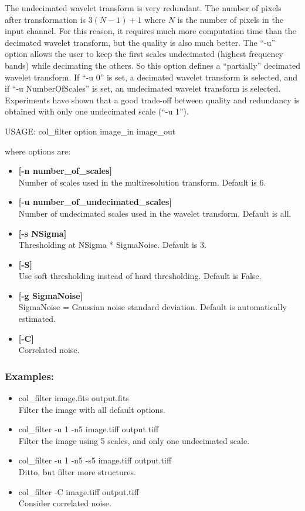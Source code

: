 The undecimated wavelet transform is very redundant. The number of pixels
after transformation is $3(N-1)+1$ where $N$ is the number of pixels in the
input channel. For this reason, it requires much more computation time
than the decimated wavelet transform, but the quality is also much better.
The ``-u'' option allows the user to keep the first scales undecimated 
(highest frequency bands) while decimating the others. So this option defines 
a ``partially'' decimated wavelet transform. If ``-u 0'' is set, a decimated
wavelet transform is selected, and if ``-u NumberOfScales'' is set, an
undecimated wavelet transform
is selected. Experiments have shown that a good trade-off between
quality and redundancy is obtained with only one undecimated scale (``-u 1'').

{\bf
\begin{center}
 USAGE: col\_filter option image\_in image\_out
\end{center}}
where options are:
\begin{itemize}     
\baselineskip=0.4truecm
\itemsep=0.1truecm
\item {\bf [-n number\_of\_scales]}  \\
Number of scales used in the multiresolution transform. Default is 6.
\item {\bf [-u number\_of\_undecimated\_scales]} \\
Number of undecimated scales used in the  wavelet transform.
Default is all. 
\item {\bf [-s NSigma]}  \\
Thresholding at NSigma * SigmaNoise. Default is 3.  
\item {\bf [-S]} \\
Use soft thresholding instead of hard thresholding.
Default is False.
\item {\bf [-g SigmaNoise]}  \\
SigmaNoise = Gaussian noise standard deviation. 
Default is automatically estimated.
\item {\bf [-C]} \\
Correlated noise. 
\end{itemize}
\subsubsection*{Examples:}
\begin{itemize}
\item col\_filter image.fits  output.fits \\
Filter the image with all default options.
\item col\_filter -u 1 -n5  image.tiff output.tiff  \\
Filter the image using 5 scales, and only one undecimated scale.
\item col\_filter -u 1 -n5 -s5 image.tiff output.tiff  \\
Ditto, but filter more structures.
\item col\_filter -C image.tiff output.tiff  \\
Consider correlated noise.
\end{itemize}


